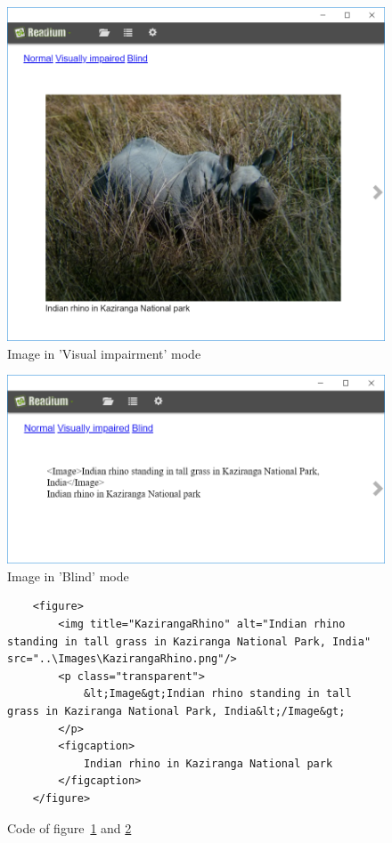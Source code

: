 \begin{figure}
	\centering
	\includegraphics[width=\linewidth]{figures/ImageVi.PNG}
	\caption{Image in 'Visual impairment' mode}
	\label{fig:image_viimp}
\end{figure}

\begin{figure}
	\centering
	\includegraphics[width=\linewidth]{figures/ImageBl.PNG}
	\caption{Image in 'Blind' mode}
	\label{fig:image_blind}
\end{figure}

\begin{figure}
	\begin{lstlisting}
	<figure>
		<img title="KazirangaRhino" alt="Indian rhino standing in tall grass in Kaziranga National Park, India" src="..\Images\KazirangaRhino.png"/>
		<p class="transparent">
			&lt;Image&gt;Indian rhino standing in tall grass in Kaziranga National Park, India&lt;/Image&gt;
		</p>
		<figcaption> 
			Indian rhino in Kaziranga National park
		</figcaption>
	</figure>
	\end{lstlisting}
	\caption{Code of figure~\ref{fig:image_viimp} and \ref{fig:image_blind}}
	\label{fig:image_code}
\end{figure}

